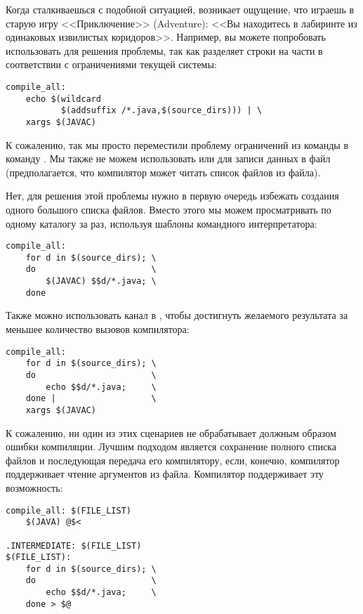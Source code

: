 Когда сталкиваешься с подобной ситуацией, возникает ощущение, что
играешь в старую игру <<Приключение>> (Adventure): <<Вы находитесь в
лабиринте из одинаковых извилистых коридоров>>. Например, вы можете
попробовать использовать  для решения проблемы, так как
 разделяет строки на части в соответствии с
ограничениями текущей системы:

{\footnotesize
\begin{verbatim}
compile_all:
    echo $(wildcard
           $(addsuffix /*.java,$(source_dirs))) | \
    xargs $(JAVAC)
\end{verbatim}
}

К сожалению, так мы просто переместили проблему ограничений из команды
\utility{javac} в команду . Мы также не можем
использовать \utility{echo} или  для записи данных в
файл (предполагается, что компилятор может читать список файлов из
файла).

Нет, для решения этой проблемы нужно в первую очередь избежать
создания одного большого списка файлов. Вместо этого мы можем
просматривать по одному каталогу за раз, используя шаблоны командного
интерпретатора:

{\footnotesize
\begin{verbatim}
compile_all:
    for d in $(source_dirs); \
    do                       \
        $(JAVAC) $$d/*.java; \
    done
\end{verbatim}
}

Также можно использовать канал в , чтобы достигнуть
желаемого результата за меньшее количество вызовов компилятора:

{\footnotesize
\begin{verbatim}
compile_all:
    for d in $(source_dirs); \
    do                       \
        echo $$d/*.java;     \
    done |                   \
    xargs $(JAVAC)
\end{verbatim}
}

К сожалению, ни один из этих сценариев не обрабатывает должным образом
ошибки компиляции. Лучшим подходом является сохранение полного списка
файлов и последующая передача его компилятору, если, конечно,
компилятор поддерживает чтение аргументов из файла. Компилятор \Java{}
поддерживает эту возможность:

{\footnotesize
\begin{verbatim}
compile_all: $(FILE_LIST)
    $(JAVA) @$<

.INTERMEDIATE: $(FILE_LIST)
$(FILE_LIST):
    for d in $(source_dirs); \
    do                       \
        echo $$d/*.java;     \
    done > $@

\end{verbatim}
}

